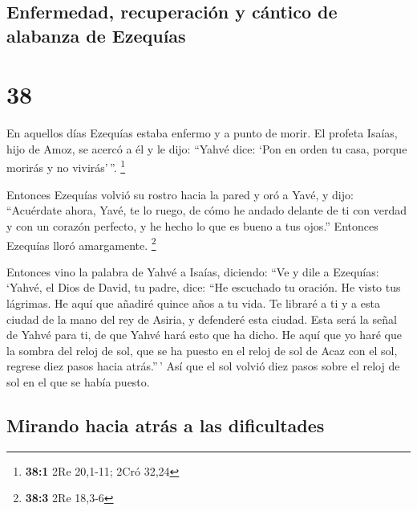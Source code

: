 \hypertarget{enfermedad-recuperaciuxf3n-y-cuxe1ntico-de-alabanza-de-ezequuxedas}{%
\subsection{Enfermedad, recuperación y cántico de alabanza de
Ezequías}\label{enfermedad-recuperaciuxf3n-y-cuxe1ntico-de-alabanza-de-ezequuxedas}}

\hypertarget{section-37}{%
\section{38}\label{section-37}}

 En aquellos días Ezequías estaba enfermo y a punto de
morir. El profeta Isaías, hijo de Amoz, se acercó a él y le dijo:
``Yahvé dice: `Pon en orden tu casa, porque morirás y no vivirás'\,''.
\footnote{\textbf{38:1} 2Re 20,1-11; 2Cró 32,24}

 Entonces Ezequías volvió su rostro hacia la pared y oró a
Yavé,  y dijo: ``Acuérdate ahora, Yavé, te lo ruego, de
cómo he andado delante de ti con verdad y con un corazón perfecto, y he
hecho lo que es bueno a tus ojos.'' Entonces Ezequías lloró amargamente.
\footnote{\textbf{38:3} 2Re 18,3-6}

 Entonces vino la palabra de Yahvé a Isaías, diciendo:
 ``Ve y dile a Ezequías: `Yahvé, el Dios de David, tu
padre, dice: ``He escuchado tu oración. He visto tus lágrimas. He aquí
que añadiré quince años a tu vida.  Te libraré a ti y a
esta ciudad de la mano del rey de Asiria, y defenderé esta ciudad.
 Esta será la señal de Yahvé para ti, de que Yahvé hará
esto que ha dicho.  He aquí que yo haré que la sombra del
reloj de sol, que se ha puesto en el reloj de sol de Acaz con el sol,
regrese diez pasos hacia atrás.''\,' Así que el sol volvió diez pasos
sobre el reloj de sol en el que se había puesto.

\hypertarget{mirando-hacia-atruxe1s-a-las-dificultades}{%
\subsection{Mirando hacia atrás a las
dificultades}\label{mirando-hacia-atruxe1s-a-las-dificultades}}

